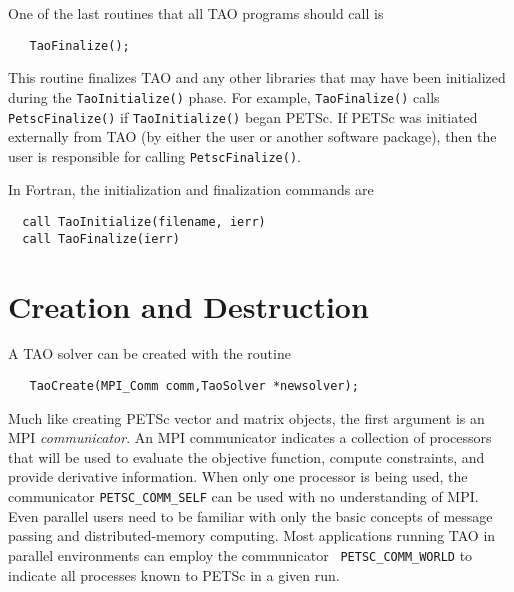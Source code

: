 One of the last routines that all TAO programs should 
call is 
\begin{verbatim}
   TaoFinalize();
\end{verbatim}
\noindent
This routine finalizes TAO and any other libraries that may have been
initialized during the {\tt TaoInitialize()} phase.
For example, {\tt TaoFinalize()}
calls {\tt PetscFinalize()} 
if {\tt TaoInitialize()}
began PETSc. If PETSc was initiated externally from TAO (by either
the user or another software package), then the user is
responsible for calling {\tt PetscFinalize()}. 

In Fortran, the initialization and finalization commands are
\begin{verbatim}
  call TaoInitialize(filename, ierr)
  call TaoFinalize(ierr)
\end{verbatim}

\section{Creation and Destruction}

A TAO solver can be created with
the routine
\begin{verbatim}
   TaoCreate(MPI_Comm comm,TaoSolver *newsolver);
\end{verbatim}
\noindent
Much like creating PETSc vector and matrix objects, 
the first argument is an MPI {\em communicator}.
An MPI \cite{using-mpi} communicator
indicates a collection of processors that will be used to evaluate the
objective function, compute constraints, and provide derivative information.
When only one processor is being used, the communicator {\tt PETSC\_COMM\_SELF}
can be used with no understanding of MPI.
Even parallel users need to be familiar with only the basic concepts 
of message passing and  distributed-memory computing. 
Most applications running TAO in
parallel environments can employ the communicator {\tt
PETSC\_COMM\_WORLD} to indicate all processes known to PETSc in a given run.

